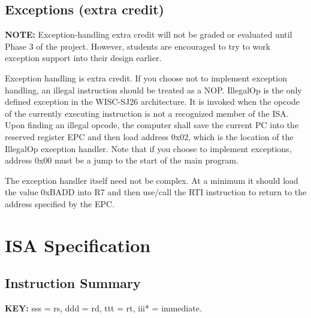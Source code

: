 \documentclass[11pt]{article}
\begin{document}
\subsection{Exceptions (extra credit)}
\textbf{NOTE:} Exception-handling extra credit will not be graded or evaluated until Phase 3 of the project. However, students are encouraged to try to work exception support into their design earlier.

Exception handling is extra credit. If you choose not to implement exception handling, an illegal instruction should be treated as a NOP. IllegalOp is the only defined exception in the WISC-SJ26 architecture. It is invoked when the opcode of the currently executing instruction is not a recognized member of the ISA. Upon finding an illegal opcode, the computer shall save the current PC into the reserved register EPC and then load address 0x02, which is the location of the IllegalOp exception handler. Note that if you choose to implement exceptions, address 0x00 must be a jump to the start of the main program.

The exception handler itself need not be complex. At a minimum it should load the value 0xBADD into R7 and then use/call the RTI instruction to return to the address specified by the EPC.


\clearpage
\section{ISA Specification}

\subsection{Instruction Summary}
\noindent\textbf{KEY:} sss = rs, ddd = rd, ttt = rt, iii* = immediate.
\end{document}
